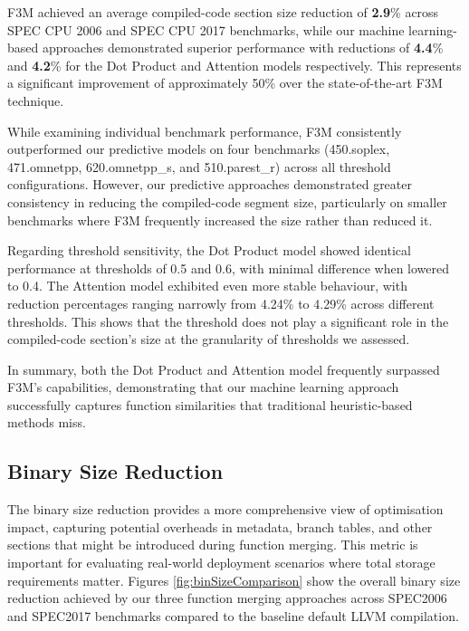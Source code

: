 F3M achieved an average compiled-code section size reduction of \textbf{2.9}\% across SPEC CPU 2006 and SPEC CPU 2017 benchmarks, while our machine learning-based approaches demonstrated superior performance with reductions of \textbf{4.4}\% and \textbf{4.2}\% for the Dot Product and Attention models respectively. This represents a significant improvement of approximately 50\% over the state-of-the-art F3M technique.

While examining individual benchmark performance, F3M consistently outperformed our predictive models on four benchmarks (450.soplex, 471.omnetpp, 620.omnetpp\_s, and 510.parest\_r) across all threshold configurations. However, our predictive approaches demonstrated greater consistency in reducing the compiled-code segment size, particularly on smaller benchmarks where F3M frequently increased the size rather than reduced it.

Regarding threshold sensitivity, the Dot Product model showed identical performance at thresholds of 0.5 and 0.6, with minimal difference when lowered to 0.4. The Attention model exhibited even more stable behaviour, with reduction percentages ranging narrowly from 4.24\% to 4.29\% across different thresholds. This shows that the threshold does not play a significant role in the compiled-code section's size at the granularity of thresholds we assessed.


In summary, both the Dot Product and Attention model frequently surpassed F3M's capabilities, demonstrating that our machine learning approach successfully captures function similarities that traditional heuristic-based methods miss.

\subsection{Binary Size Reduction}
The binary size reduction provides a more comprehensive view of optimisation impact, capturing potential overheads in metadata, branch tables, and other sections that might be introduced during function merging. This metric is important for evaluating real-world deployment scenarios where total storage requirements matter. Figures \ref{fig:binSizeComparison} show the overall binary size reduction achieved by our three function merging approaches across SPEC2006 and SPEC2017 benchmarks compared to the baseline default LLVM compilation. 

